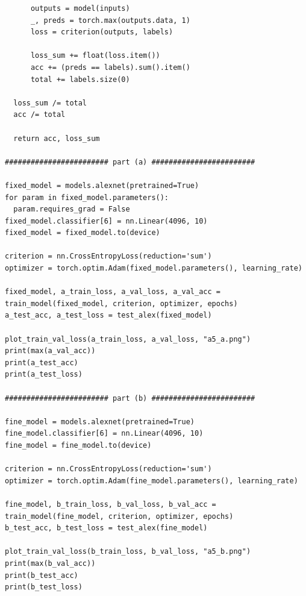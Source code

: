 \documentclass{article}
\newcommand{\1}{\mathbf{1}}
\begin{document}
{\begin{verbatim}
      outputs = model(inputs)
      _, preds = torch.max(outputs.data, 1)
      loss = criterion(outputs, labels)

      loss_sum += float(loss.item())
      acc += (preds == labels).sum().item()
      total += labels.size(0)
        
  loss_sum /= total
  acc /= total

  return acc, loss_sum

######################## part (a) ########################

fixed_model = models.alexnet(pretrained=True)
for param in fixed_model.parameters():
  param.requires_grad = False
fixed_model.classifier[6] = nn.Linear(4096, 10)
fixed_model = fixed_model.to(device)

criterion = nn.CrossEntropyLoss(reduction='sum')
optimizer = torch.optim.Adam(fixed_model.parameters(), learning_rate)

fixed_model, a_train_loss, a_val_loss, a_val_acc = train_model(fixed_model, criterion, optimizer, epochs)
a_test_acc, a_test_loss = test_alex(fixed_model)

plot_train_val_loss(a_train_loss, a_val_loss, "a5_a.png")
print(max(a_val_acc))
print(a_test_acc)
print(a_test_loss)

######################## part (b) ########################

fine_model = models.alexnet(pretrained=True)
fine_model.classifier[6] = nn.Linear(4096, 10)
fine_model = fine_model.to(device)

criterion = nn.CrossEntropyLoss(reduction='sum')
optimizer = torch.optim.Adam(fine_model.parameters(), learning_rate)

fine_model, b_train_loss, b_val_loss, b_val_acc = train_model(fine_model, criterion, optimizer, epochs)
b_test_acc, b_test_loss = test_alex(fine_model)

plot_train_val_loss(b_train_loss, b_val_loss, "a5_b.png")
print(max(b_val_acc))
print(b_test_acc)
print(b_test_loss)
\end{verbatim}

\newpage

}
\end{document}
